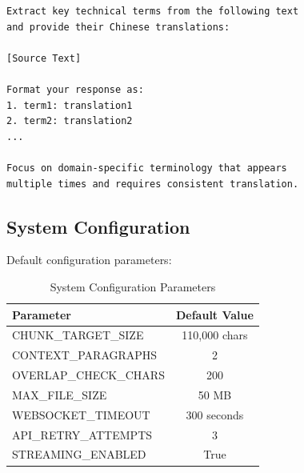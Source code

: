 \documentclass[11pt]{article}
\begin{document}
\begin{lstlisting}[caption=Dynamic Terminology Extraction]
Extract key technical terms from the following text 
and provide their Chinese translations:

[Source Text]

Format your response as:
1. term1: translation1
2. term2: translation2
...

Focus on domain-specific terminology that appears 
multiple times and requires consistent translation.
\end{lstlisting}

\subsection{System Configuration}

Default configuration parameters:

\begin{table}[ht]
\centering
\small
\begin{tabular}{lc}
\toprule
\textbf{Parameter} & \textbf{Default Value} \\
\midrule
CHUNK\_TARGET\_SIZE & 110,000 chars \\
CONTEXT\_PARAGRAPHS & 2 \\
OVERLAP\_CHECK\_CHARS & 200 \\
MAX\_FILE\_SIZE & 50 MB \\
WEBSOCKET\_TIMEOUT & 300 seconds \\
API\_RETRY\_ATTEMPTS & 3 \\
STREAMING\_ENABLED & True \\
\bottomrule
\end{tabular}
\caption{System Configuration Parameters}
\end{table}
\end{document}

